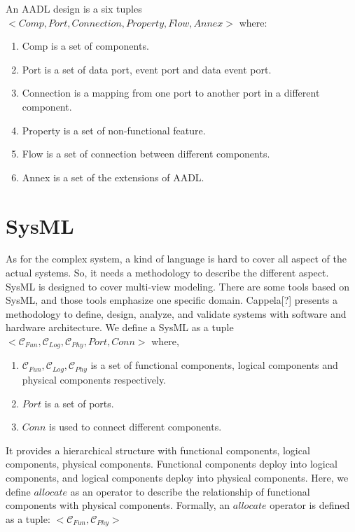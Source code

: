 An AADL design is a six tuples $<Comp, Port, Connection, Property, Flow, Annex>$ where:
\begin{enumerate}
\item Comp is a set of components.
\item Port is a set of data port, event port and data event port.
\item Connection is a mapping from one port to another port in a different component.
\item Property is a set of non-functional feature.
\item Flow is a set of connection between different components. 
\item Annex is a set of the extensions of AADL.
\end{enumerate}







\section{SysML}

As for the complex system, a kind of language is hard to cover all aspect of the actual systems. So, it needs a methodology to describe the different aspect. SysML is designed to cover multi-view modeling. There are some tools based on SysML, and those tools emphasize one specific domain. {\color{red}Cappela[?] presents a methodology to define, design, analyze, and validate systems with software and hardware architecture.}  We define a SysML as a tuple $<\mathcal{C}_{Fun}, \mathcal{C}_{Log}, \mathcal{C}_{Phy}, Port, Conn>$ where,
\begin{enumerate}
\item $\mathcal{C}_{Fun}, \mathcal{C}_{Log}, \mathcal{C}_{Phy}$ is a set of functional components, logical components and physical components respectively.
\item $Port$ is a set of ports.
\item $Conn$ is used to connect different components.
\end{enumerate}

It provides a hierarchical structure with functional components, logical components, physical components. Functional components deploy into logical components, and logical components deploy into physical components. Here, we define $allocate$ as an operator to describe the relationship of functional components with physical components. Formally, an $allocate$ operator is defined as a tuple: $<\mathcal{C}_{Fun}, \mathcal{C}_{Phy}>$

